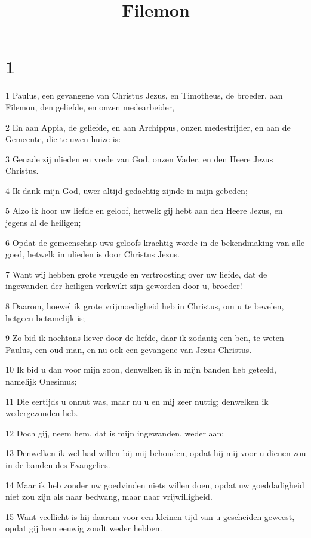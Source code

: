 

\title{Filemon}



\chapter{1}

\par 1 Paulus, een gevangene van Christus Jezus, en Timotheus, de broeder, aan Filemon, den geliefde, en onzen medearbeider,
\par 2 En aan Appia, de geliefde, en aan Archippus, onzen medestrijder, en aan de Gemeente, die te uwen huize is:
\par 3 Genade zij ulieden en vrede van God, onzen Vader, en den Heere Jezus Christus.
\par 4 Ik dank mijn God, uwer altijd gedachtig zijnde in mijn gebeden;
\par 5 Alzo ik hoor uw liefde en geloof, hetwelk gij hebt aan den Heere Jezus, en jegens al de heiligen;
\par 6 Opdat de gemeenschap uws geloofs krachtig worde in de bekendmaking van alle goed, hetwelk in ulieden is door Christus Jezus.
\par 7 Want wij hebben grote vreugde en vertroosting over uw liefde, dat de ingewanden der heiligen verkwikt zijn geworden door u, broeder!
\par 8 Daarom, hoewel ik grote vrijmoedigheid heb in Christus, om u te bevelen, hetgeen betamelijk is;
\par 9 Zo bid ik nochtans liever door de liefde, daar ik zodanig een ben, te weten Paulus, een oud man, en nu ook een gevangene van Jezus Christus.
\par 10 Ik bid u dan voor mijn zoon, denwelken ik in mijn banden heb geteeld, namelijk Onesimus;
\par 11 Die eertijds u onnut was, maar nu u en mij zeer nuttig; denwelken ik wedergezonden heb.
\par 12 Doch gij, neem hem, dat is mijn ingewanden, weder aan;
\par 13 Denwelken ik wel had willen bij mij behouden, opdat hij mij voor u dienen zou in de banden des Evangelies.
\par 14 Maar ik heb zonder uw goedvinden niets willen doen, opdat uw goeddadigheid niet zou zijn als naar bedwang, maar naar vrijwilligheid.
\par 15 Want veellicht is hij daarom voor een kleinen tijd van u gescheiden geweest, opdat gij hem eeuwig zoudt weder hebben.
